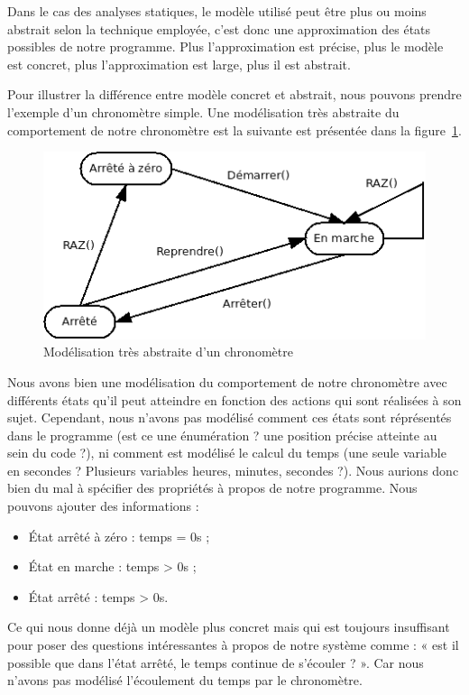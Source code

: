 \documentclass[12pt,francais,]{scrbook}
\providecommand{\tightlist}{%
  \setlength{\itemsep}{0pt}\setlength{\parskip}{0pt}}
\begin{document}
Dans le cas des analyses statiques, le modèle utilisé peut être plus ou
moins abstrait selon la technique employée, c'est donc une approximation
des états possibles de notre programme. Plus l'approximation est
précise, plus le modèle est concret, plus l'approximation est large,
plus il est abstrait.

Pour illustrer la différence entre modèle concret et abstrait, nous
pouvons prendre l'exemple d'un chronomètre simple. Une modélisation très
abstraite du comportement de notre chronomètre est la suivante est
présentée dans la figure~\ref{fig:1-1-chrono}.

\begin{figure}[htbp]
\centering
\includegraphics[scale=0.5]{1-1-model.png}
\caption{Modélisation très abstraite d'un chronomètre}
\label{fig:1-1-chrono}
\end{figure}

Nous avons bien une modélisation du comportement de notre chronomètre
avec différents états qu'il peut atteindre en fonction des actions qui
sont réalisées à son sujet. Cependant, nous n'avons pas modélisé comment
ces états sont réprésentés dans le programme (est ce une énumération ?
une position précise atteinte au sein du code ?), ni comment est
modélisé le calcul du temps (une seule variable en secondes ? Plusieurs
variables heures, minutes, secondes ?). Nous aurions donc bien du mal à
spécifier des propriétés à propos de notre programme. Nous pouvons
ajouter des informations :

\begin{itemize}
\tightlist
\item
  État arrêté à zéro : temps = 0s ;
\item
  État en marche : temps \textgreater{} 0s ;
\item
  État arrêté : temps \textgreater{} 0s.
\end{itemize}

Ce qui nous donne déjà un modèle plus concret mais qui est toujours
insuffisant pour poser des questions intéressantes à propos de notre
système comme : « est il possible que dans l'état arrêté, le temps
continue de s'écouler ? ». Car nous n'avons pas modélisé l'écoulement du
temps par le chronomètre.
\end{document}
